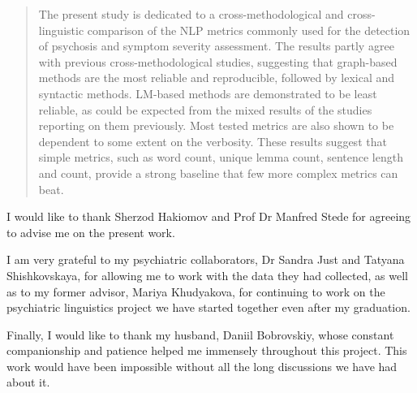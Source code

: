 \documentclass[
12pt, %
oneside, %
english, %
onehalfspacing, %
nolistspacing, %
parskip, %
headsepline, %
]{MastersDoctoralThesis} %
\begin{document}
\cleardoublepage






\begin{abstract}
The present study is dedicated to a cross-methodological and cross-linguistic comparison of the NLP metrics commonly used for the detection of psychosis and symptom severity assessment. The results partly agree with previous cross-methodological studies, suggesting that graph-based methods are the most reliable and reproducible, followed by lexical and syntactic methods. LM-based methods are demonstrated to be least reliable, as could be expected from the mixed results of the studies reporting on them previously. Most tested metrics are also shown to be dependent to some extent on the verbosity. These results suggest that simple metrics, such as word count, unique lemma count, sentence length and count, provide a strong baseline that few more complex metrics can beat.
\end{abstract}


\begin{acknowledgements}
\addchaptertocentry{\acknowledgementname} %
I would like to thank Sherzod Hakiomov and Prof Dr Manfred Stede for agreeing to advise me on the present work. 

I am very grateful to my psychiatric collaborators, Dr Sandra Just and Tatyana Shishkovskaya, for allowing me to work with the data they had collected, as well as to my former advisor, Mariya Khudyakova, for continuing to work on the psychiatric linguistics project we have started together even after my graduation. 

Finally, I would like to thank my husband, Daniil Bobrovskiy, whose constant companionship and patience helped me immensely throughout this project. This work would have been impossible without all the long discussions we have had about it.
\end{acknowledgements}
\end{document}
